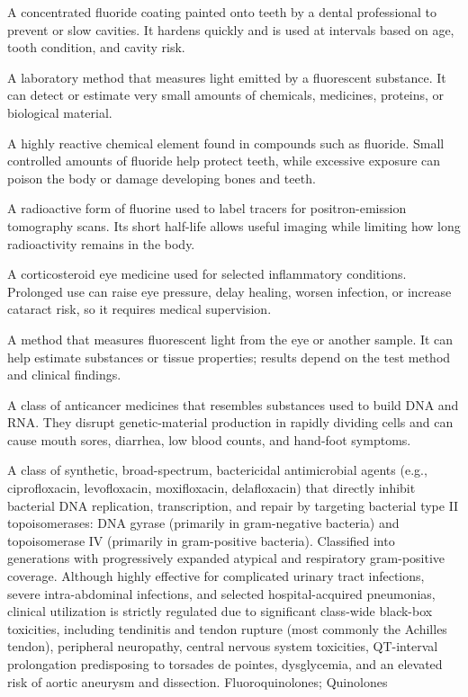  A concentrated fluoride coating painted onto teeth by a dental professional to prevent or slow cavities. It hardens quickly and is used at intervals based on age, tooth condition, and cavity risk.

 A laboratory method that measures light emitted by a fluorescent substance. It can detect or estimate very small amounts of chemicals, medicines, proteins, or biological material.

 A highly reactive chemical element found in compounds such as fluoride. Small controlled amounts of fluoride help protect teeth, while excessive exposure can poison the body or damage developing bones and teeth.

 A radioactive form of fluorine used to label tracers for positron-emission tomography scans. Its short half-life allows useful imaging while limiting how long radioactivity remains in the body.

 A corticosteroid eye medicine used for selected inflammatory conditions. Prolonged use can raise eye pressure, delay healing, worsen infection, or increase cataract risk, so it requires medical supervision.

 A method that measures fluorescent light from the eye or another sample. It can help estimate substances or tissue properties; results depend on the test method and clinical findings.

 A class of anticancer medicines that resembles substances used to build DNA and RNA. They disrupt genetic-material production in rapidly dividing cells and can cause mouth sores, diarrhea, low blood counts, and hand-foot symptoms.

 A class of synthetic, broad-spectrum, bactericidal antimicrobial agents (e.g., ciprofloxacin, levofloxacin, moxifloxacin, delafloxacin) that directly inhibit bacterial DNA replication, transcription, and repair by targeting bacterial type II topoisomerases: DNA gyrase (primarily in gram-negative bacteria) and topoisomerase IV (primarily in gram-positive bacteria). Classified into generations with progressively expanded atypical and respiratory gram-positive coverage. Although highly effective for complicated urinary tract infections, severe intra-abdominal infections, and selected hospital-acquired pneumonias, clinical utilization is strictly regulated due to significant class-wide black-box toxicities, including tendinitis and tendon rupture (most commonly the Achilles tendon), peripheral neuropathy, central nervous system toxicities, QT-interval prolongation predisposing to torsades de pointes, dysglycemia, and an elevated risk of aortic aneurysm and dissection.
\synonyms
Fluoroquinolones; Quinolones

